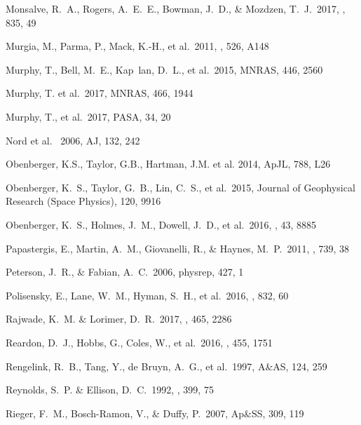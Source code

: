 \documentclass[11pt]{article}
\begin{document}
\begin{thebibliography}{}
 Monsalve, R.~A., Rogers, A.~E.~E., Bowman, J.~D., \& Mozdzen, T.~J.\ 2017, \apj, 835, 49 

 Murgia, M., Parma, P., Mack, K.-H., et al.\ 2011, \aap, 526, A148 


 Murphy, T., Bell, M.~E., Kap\
lan, D.~L., et al.\ 2015, MNRAS, 446, 2560

 Murphy, T. et al.\ 2017, MNRAS, 466, 1944

 Murphy, T., et al.\ 2017, PASA, 34, 20

 Nord et al. \ 2006, AJ, 132, 242 

 Obenberger, K.S., Taylor, G.B., Hartman, J.M. et al. 2014, ApJL, 788, L26

 Obenberger, K.~S., Taylor, G.~B., Lin, C.~S., et al.\ 2015, Journal of Geophysical Research (Space Physics), 120, 9916 

 Obenberger, K.~S., Holmes, J.~M., Dowell, J.~D., et al.\ 2016, \grl, 43, 8885 

 Papastergis, E., Martin, A.~M., Giovanelli, R., \& Haynes, M.~P.\ 2011, \apj, 739, 38 

 Peterson, J.~R., \& Fabian, A.~C.\ 2006, physrep, 427, 1 

 Polisensky, E., Lane, W.~M., Hyman, S.~H., et al.\ 2016, \apj, 832, 60 

 Rajwade, K.~M. \& Lorimer, D.~R.\ 2017, \mnras, 465, 2286

 Reardon, D.~J., Hobbs, G., Coles, W., et al.\ 2016, \mnras, 455, 1751 

 Rengelink, R.~B., Tang, Y., de Bruyn, A.~G., et al.\ 1997, A\&AS, 124, 259  

 Reynolds, S.~P. \& Ellison, D.~C.\ 1992, \apjl, 399, 75 

 Rieger, F.~M., Bosch-Ramon, V., \&
Duffy, P.\ 2007, Ap\&SS, 309, 119


\end{thebibliography}
\end{document}

